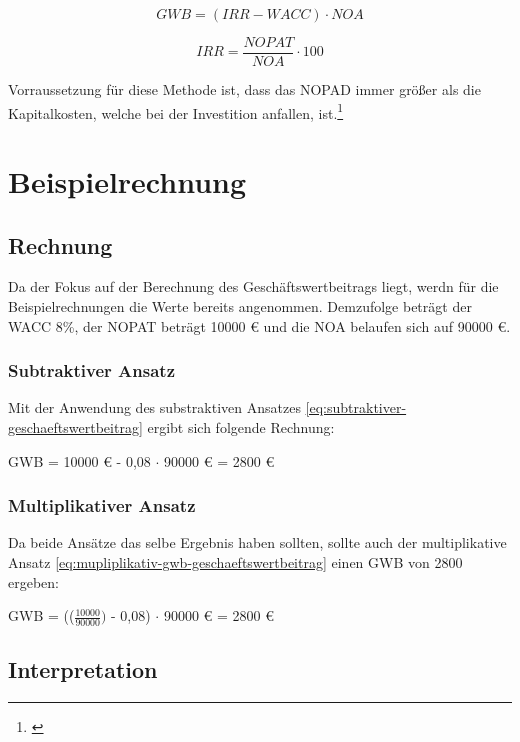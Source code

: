 \begin{equation}
    GWB = (IRR - WACC) \cdot NOA
    \label{eq:mupliplikativ-gwb-geschaeftswertbeitrag}
\end{equation}

\begin{equation}
    IRR = \frac{NOPAT}{NOA} \cdot 100
    \label{eq:mupliplikativ-irr-geschaeftswertbeitrag}
\end{equation}

\bigskip

\noindent
Vorraussetzung für diese Methode ist, dass das NOPAD immer größer als die Kapitalkosten, welche bei der Investition anfallen, ist.\footnote{\cite{bwllexicon-eva}}

\section{Beispielrechnung}

\subsection{Rechnung}

Da der Fokus auf der Berechnung des Geschäftswertbeitrags liegt, werdn für die Beispielrechnungen die Werte bereits angenommen. Demzufolge beträgt der WACC 8\%, der NOPAT beträgt 10000 € und die NOA belaufen sich auf 90000 €.

\subsubsection{Subtraktiver Ansatz}

Mit der Anwendung des substraktiven Ansatzes \eqref{eq:subtraktiver-geschaeftswertbeitrag} ergibt sich folgende Rechnung:

\bigskip
\noindent
GWB = 10000 € - 0,08 $\cdot$ 90000 € = 2800 €


\subsubsection{Multiplikativer Ansatz}

Da beide Ansätze das selbe Ergebnis haben sollten, sollte auch der multiplikative Ansatz \eqref{eq:mupliplikativ-gwb-geschaeftswertbeitrag} einen GWB von 2800 ergeben:

\bigskip
\noindent
GWB = (($\frac{10000}{90000})$ - 0,08) $\cdot$ 90000 € = 2800 €

\subsection{Interpretation}

